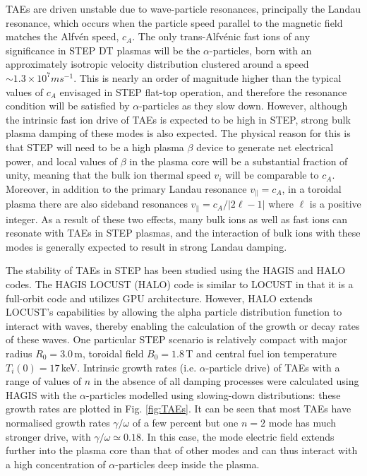 \documentclass[10pt, a4paper, twoside]{article}
\begin{document}
TAEs are driven unstable due to wave-particle resonances, principally the Landau resonance, which occurs when the particle speed parallel to the magnetic field matches the Alfv\'en speed, $c_A$. The only trans-Alfv\'enic fast ions of any significance in STEP DT plasmas will be the $\alpha$-particles, born with an approximately isotropic velocity distribution clustered around a speed $\sim 1.3\times\si{10^7ms^{-1}}$. This is nearly an order of magnitude higher than the typical values of $c_A$ envisaged in STEP flat-top operation, and therefore the resonance condition will be satisfied by $\alpha$-particles as they slow down. However, although the intrinsic fast ion drive of TAEs is expected to be high in STEP, strong bulk plasma damping of these modes is also expected. The physical reason for this is that STEP will need to be a high plasma $\beta$ device to generate net electrical power, and local values of $\beta$ in the plasma core will be a substantial fraction of unity, meaning that the bulk ion thermal speed $v_i$ will be comparable to $c_A$. Moreover, in addition to the primary Landau resonance $v_{\parallel}=c_A$, in a toroidal plasma there are also sideband resonances $v_{\parallel} = c_A/\vert 2\ell-1 \vert$ where $\ell$ is a positive integer. As a result of these two effects, many bulk ions as well as fast ions can resonate with TAEs in STEP plasmas, and the interaction of bulk ions with these modes is generally expected to result in strong Landau damping.

The stability of TAEs in STEP has been studied using the HAGIS \cite{pinches1998} and HALO \cite{fitzgerald2020} codes. The HAGIS LOCUST (HALO) code is similar to LOCUST in that it is a full-orbit code and utilizes GPU architecture. However, HALO extends LOCUST's capabilities by allowing the alpha particle distribution function to interact with waves, thereby enabling the calculation of the growth or decay rates of these waves.
One particular STEP scenario is relatively compact with major radius $R_0 = 3.0\,$m, toroidal field $B_0 = 1.8\,$T and central fuel ion temperature $T_i(0)=17\,$keV. Intrinsic growth rates (i.e. $\alpha$-particle drive) of TAEs with a range of values of $n$ in the absence of all damping processes were calculated using HAGIS with the $\alpha$-particles modelled using slowing-down distributions: these growth rates are plotted in Fig. \ref{fig:TAEs}. It can be seen that most TAEs have normalised growth rates $\gamma/\omega$ of a few percent but one $n=2$ mode has much stronger drive, with $\gamma/\omega \simeq 0.18$. In this case, the mode electric field extends further into the plasma core than that of other modes and can thus interact with a high concentration of $\alpha$-particles deep inside the plasma. 
\end{document}
